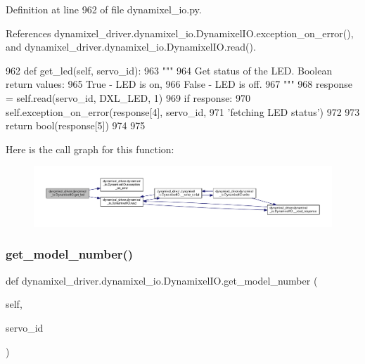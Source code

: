 Definition at line 962 of file dynamixel\+\_\+io.\+py.



References dynamixel\+\_\+driver.\+dynamixel\+\_\+io.\+Dynamixel\+I\+O.\+exception\+\_\+on\+\_\+error(), and dynamixel\+\_\+driver.\+dynamixel\+\_\+io.\+Dynamixel\+I\+O.\+read().


\begin{DoxyCode}
962     \textcolor{keyword}{def }get\_led(self, servo\_id):
963         \textcolor{stringliteral}{"""}
964 \textcolor{stringliteral}{        Get status of the LED. Boolean return values:}
965 \textcolor{stringliteral}{            True - LED is on,}
966 \textcolor{stringliteral}{            False - LED is off.}
967 \textcolor{stringliteral}{        """}
968         response = self.read(servo\_id, DXL\_LED, 1)
969         \textcolor{keywordflow}{if} response:
970             self.exception\_on\_error(response[4], servo\_id,
971                 \textcolor{stringliteral}{'fetching LED status'})
972 
973         \textcolor{keywordflow}{return} bool(response[5])
974 
975 
\end{DoxyCode}
Here is the call graph for this function\+:
\nopagebreak
\begin{figure}[H]
\begin{center}
\leavevmode
\includegraphics[width=350pt]{dd/d77/classdynamixel__driver_1_1dynamixel__io_1_1_dynamixel_i_o_a1080dc1550b89b705ed7995ef4e67349_cgraph}
\end{center}
\end{figure}
\mbox{\label{classdynamixel__driver_1_1dynamixel__io_1_1_dynamixel_i_o_a3f2d1b9ac285fb0490edfd2a4c7243c2}} 
\subsubsection{\texorpdfstring{get\+\_\+model\+\_\+number()}{get\_model\_number()}}
{\footnotesize\ttfamily def dynamixel\+\_\+driver.\+dynamixel\+\_\+io.\+Dynamixel\+I\+O.\+get\+\_\+model\+\_\+number (\begin{DoxyParamCaption}\item[{}]{self,  }\item[{}]{servo\+\_\+id }\end{DoxyParamCaption})}




